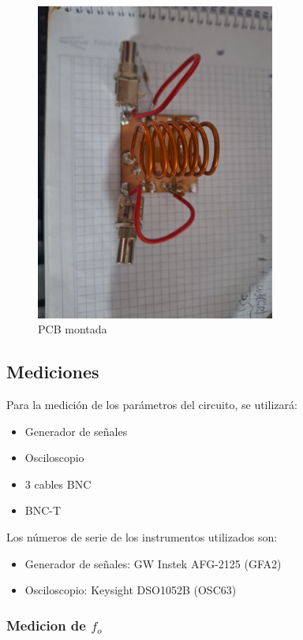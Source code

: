\begin{figure}[H]
    \centering
    \includegraphics[width=0.7\textwidth]{Imagenes/pcb2.jpeg}
    \caption{PCB montada}
\end{figure}


\newpage
\subsection{Mediciones}

Para la medición de los parámetros del circuito, se utilizará:

\begin{itemize}
    \item Generador de señales
    \item Osciloscopio
    \item 3 cables BNC
    \item BNC-T 
\end{itemize}

Los números de serie de los instrumentos utilizados son:

\begin{itemize}
    \item Generador de señales: GW Instek AFG-2125 (GFA2)
    \item Osciloscopio: Keysight DSO1052B (OSC63)
\end{itemize}

\subsubsection{Medicion de $f_o$}

